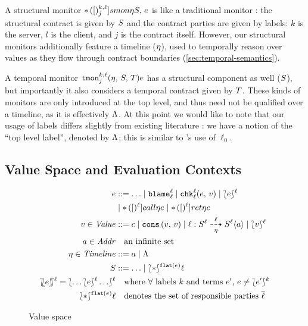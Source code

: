 \documentclass[preprint,onecolumn,9pt]{sigplanconf} %
\begin{document}
%
A structural monitor ${\tt *}{\,}({[})^{k,\ell}_{j}]{smon}{\eta}{S,\, e}$ is like a traditional monitor \cite{ianjohnson:dthf:complete}: the structural contract is given by $S$ and the contract parties are given by labels: $k$ is the server, $l$ is the client, and $j$ is the contract itself.
%
However, our structural monitors additionally feature a timeline ($\eta$), used to temporally reason over values as they flow through contract boundaries (\autoref{sec:temporal-semantics}).
%

%
A temporal monitor ${\tt tmon}{^{k,\ell}_{j}}({\eta,\,S,\,T}){e}$ has a structural component as well ($S$), but importantly it also considers a temporal contract given by $T$.
%
These kinds of monitors are only introduced at the top level, and thus need not be qualified over a timeline, as it is effectively $\Lambda$.
%
At this point we would like to note that our usage of labels differs slightly from existing literature \cite{ianjohnson:dthf:complete}: we have a notion of the ``top level label'', denoted by $\Lambda$; this is similar to \citeauthor{ianjohnson:dthf:complete}'s use of $\ell_0$.

\subsection{Value Space and Evaluation Contexts}

\begin{figure}
\begin{align*}
\mexp &::= \ldots
 \alt \sblame{\mmlab}{\mmlab}
 \alt \schk{\mmlab}{\mmlab}{\mexp}{\mval}
 \alt \sown{\mexp}{\mmlab} \\
&\alt \scall{\mmlab}{\mtimeline}{\mexp}
 \alt \sret{\mmlab}{\mtimeline}{\mexp}
\\
\mval \in \Value &::=
     \mconstant
\alt \vcons{\mval}{\mval}
\alt \bclos{\mmlab}{\mscon}{\mmlab}{\mmlab}{\mtimeline}{\mscon}{\mmlab}{\maddr}
\alt \sown{\mval}{\mmlab}
\\
\maddr \in \Addr &\quad\text{an infinite set} \\
\mstimeline \in \Timeline &::= \maddr \alt \toplevel
\\
\mscon &::= \ldots
\alt \sown*{\sflat{\mexp}}{\mmlab}
\\
\sOwn{\mexp}{\mmlab} = \sown{ \ldots \sown{\mexp}{\mmlab} \ldots }{\mmlab}
&\quad\text{where $\forall$ labels $k$ and terms $\mexp^\prime$, $\mexp \neq \sown{\mexp^\prime}{k}$}
\\
\sown*{\sflat{\mexp}}{\mmlab} &\quad\text{denotes the set of responsible parties $\overline{\mmlab}$}
\end{align*}
\caption{Value space}
\label{fig:values}
\end{figure}
\end{document}
